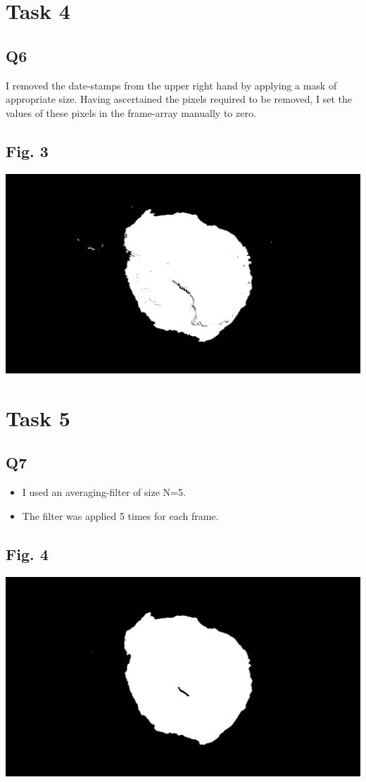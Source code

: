\documentclass[11pt]{article}
\begin{document}
\section*{Task 4}
\subsection*{Q6}
I removed the date-stamps from the upper right hand by applying a mask of appropriate size. Having ascertained the pixels required to be removed, I set the values of these pixels in the frame-array manually to zero. 

\subsection*{Fig. 3}
\includegraphics[width=\textwidth]{reportImages/figure3}


\section*{Task 5}
\subsection*{Q7}
\begin{itemize}
	\item I used an averaging-filter of size N=5. 
	\item The filter was applied 5 times for each frame. 
\end{itemize}
\subsection*{Fig. 4}
\includegraphics[width=\textwidth]{reportImages/figure4}
\end{document}
